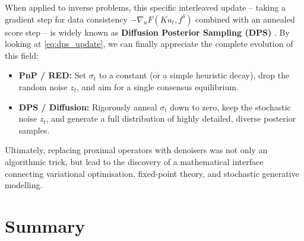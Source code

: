 When applied to inverse problems, this specific interleaved update -- taking a gradient step for data consistency $-\nabla_u F(K u_t, f^\delta)$ combined with an annealed score step -- is widely known as \textbf{Diffusion Posterior Sampling (DPS)} \cite{chung2023diffusion}. By looking at \eqref{eq:dps_update}, we can finally appreciate the complete evolution of this field:
\begin{itemize}
    \item \textbf{PnP / RED:} Set $\sigma_t$ to a constant (or a simple heuristic decay), drop the random noise $z_t$, and aim for a single consensus equilibrium.
    \item \textbf{DPS / Diffusion:} Rigorously anneal $\sigma_t$ down to zero, keep the stochastic noise $z_t$, and generate a full distribution of highly detailed, diverse posterior samples.
\end{itemize}
Ultimately, replacing proximal operators with denoisers was not only an algorithmic trick, but lead to the discovery of a mathematical interface connecting variational optimisation, fixed-point theory, and stochastic generative modelling.

\section{Summary}

